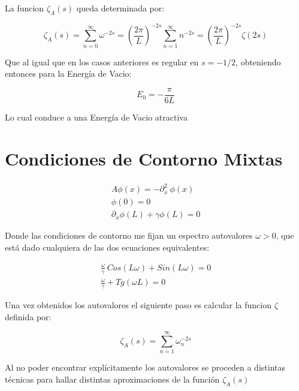 La funcion $\zeta _A (s)$ queda determinada por:

\begin{equation}
\zeta _A (s) = 
\sum _{n=0} ^{\infty} \omega ^{-2s} =  
\left( \frac{2 \pi}{L} \right) ^{-2s} \sum _{n=1} ^{\infty} n ^{-2s} = 
\left( \frac{2 \pi}{L} \right) ^{-2s} \zeta (2s)
\end{equation}

Que al igual que en los casos anteriores es regular en $s=-1/2$, obteniendo entonces para la Energía de Vacio:

\begin{equation}
E _0 = - \frac{\pi}{6 L}
\end{equation}

Lo cual conduce a una Energía de Vacio atractiva

\section{Condiciones de Contorno Mixtas}

\begin{equation}
\begin{array}{c}
    A \phi (x) = - \partial ^2 _x \ \phi (x)  \\
    \phi (0) = 0 \\ 
    \partial _x \phi (L) + \gamma \phi (L) = 0
\end{array}
\end{equation}

Donde las condiciones de contorno me fijan un espectro autovalores $\omega > 0 $, que está dado cualquiera de las dos ecuaciones equivalentes: 

\begin{equation}
\begin{array}{cc}
    \frac{\omega}{\gamma}  \ Cos( L \omega ) +   Sin( L \omega ) = 0 \\
    \frac{\omega}{\gamma}  + Tg(\omega L )  = 0 
\label{autovalores}
\end{array}
\end{equation}

Una vez obtenidos los autovalores el siguiente paso es calcular la funcion $\zeta$ definida por:

\begin{equation}
    \zeta _ {A } (s) = \sum_{n = 1} ^{ \infty } \omega _n ^ {-2 s}
\end{equation}

Al no poder encontrar explícitamente los autovalores se proceden a distintas técnicas para hallar distintas aproximaciones de la función $\zeta _A (s)$

